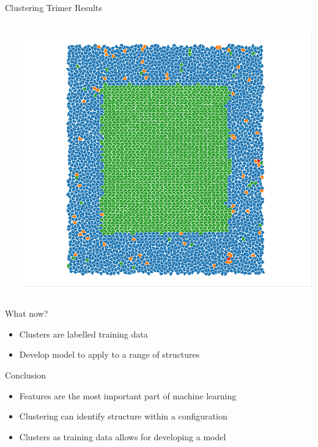 \documentclass[aspectratio=169, 14pt]{beamer}
\begin{document}
\begin{frame}{Clustering Trimer Results}
\begin{columns}
\begin{column}{0.33\textwidth}
    \end{column}
    \begin{column}{0.33\textwidth}
      \includegraphics[width=\textwidth]{clustering_results_pg.png}
    \end{column}
  \end{columns}
\end{frame}


\begin{frame}{What now?}

  \begin{itemize}
    \item Clusters are labelled training data
    \item Develop model to apply to a range of structures
  \end{itemize}

\end{frame}


\begin{frame}{Conclusion}

  \begin{itemize}
    \item Features are the most important part of machine learning
    \item Clustering can identify structure within a configuration
    \item Clusters as training data allows for developing a model
  \end{itemize}

\end{frame}
\end{document}

